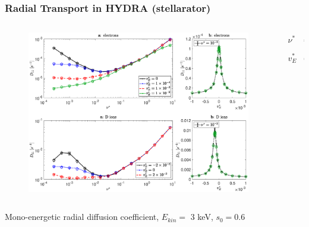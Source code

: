 \documentclass{beamer}
\newcommand{\bea}[1]{\begin{eqnarray} \label{#1}}
\newcommand{\eea}{\end{eqnarray}}
\begin{document}
\begin{frame}
\frametitle{Radial Transport in HYDRA (stellarator)}
\vspace{-1.2cm}
\hspace*{0.1cm}
\begin{columns}[t]
	\begin{column}{0.8\textwidth}
		\begin{figure}
			\vspace*{-1.05cm}
\hspace*{-0.5cm}\includegraphics[width=1\textwidth]{FIGURES/transport_coefficient_electrons_dions.eps}

\end{figure}
\end{column}
\hspace*{-1cm}
\begin{column}{0.2\textwidth}
	\vspace*{0.8cm}
	\bea*{} 
		\nu^{\ast} &=& \frac{R_0 \nu_c}{\iota v} \nonumber \\
		\quad \nonumber \\ 
		v_E^{\ast} &=& \frac{E_r}{v B_0} \nonumber
	\eea
	
	\end{column}
\end{columns}
Mono-energetic radial diffusion coefficient,\newline
$E_{kin}=$ 3 keV, $s_0 = 0.6$
\end{frame}
\end{document}
